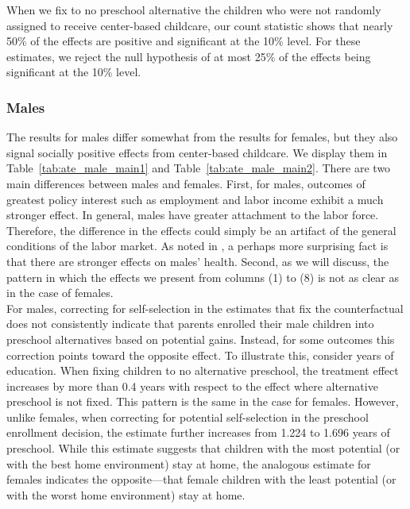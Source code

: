 \noindent When we fix to no preschool alternative the children who were not randomly assigned to receive center-based childcare, our count statistic shows that nearly 50\% of the effects are positive and significant at the 10\% level. For these estimates, we reject the null hypothesis of at most 25\% of the effects being significant at the 10\% level. \\





\subsubsection{Males} \label{section:centermales}

\noindent The results for males differ somewhat from the results for females, but they also signal socially positive effects from center-based childcare. We display them in Table~\ref{tab:ate_male_main1} and Table~\ref{tab:ate_male_main2}. There are two main differences between males and females. First, for males, outcomes of greatest policy interest such as employment and labor income exhibit a much stronger effect. In general, males have greater attachment to the labor force. Therefore, the difference in the effects could simply be an artifact of the general conditions of the labor market. As noted in \citet{Campbell_Conti_etal_2014_EarlyChildhoodInvestments}, a perhaps more surprising fact is that there are stronger effects on males' health. Second, as we will discuss, the pattern in which the effects we present from columns (1) to (8) is not as clear as in the case of females.\\

\noindent For males, correcting for self-selection in the estimates that fix the counterfactual does not consistently indicate that parents enrolled their male children into preschool alternatives based on potential gains. Instead, for some outcomes this correction points toward the opposite effect. To illustrate this, consider years of education. When fixing children to no alternative preschool, the treatment effect increases by more than 0.4 years with respect to the effect where alternative preschool is not fixed. This pattern is the same in the case for females. However, unlike females, when correcting for potential self-selection in the preschool enrollment decision, the estimate further increases from 1.224 to 1.696 years of preschool. While this estimate suggests that children with the most potential (or with the best home environment) stay at home, the analogous estimate for females indicates the opposite---that female children with the least potential (or with the worst home environment) stay at home.\\

